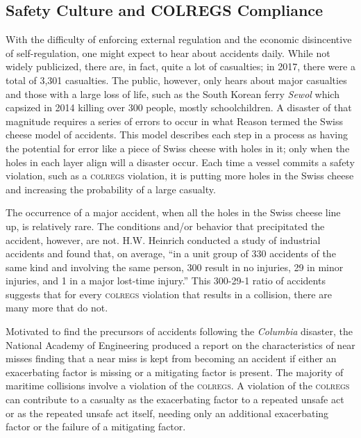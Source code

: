 \documentclass[twoside,symmetric,notoc]{tufte-book}
\begin{document}
\subsection{Safety Culture and COLREGS Compliance}
\par{%
With the difficulty of enforcing external regulation and the economic disincentive of self-regulation, one might expect to hear about accidents daily. While not widely publicized, there are, in fact, quite a lot of casualties; in 2017, there were a total of 3,301 casualties.\cite{EMSA} The public, however, only hears about major casualties and those with a large loss of life, such as the South Korean ferry \textit{Sewol} which capsized in 2014 killing over 300 people, mostly schoolchildren.\cite{Kim} A disaster of that magnitude requires a series of errors to occur in what Reason termed the Swiss cheese model of accidents. This model describes each step in a process as having the potential for error like a piece of Swiss cheese with holes in it; only when the holes in each layer align will a disaster occur. Each time a vessel commits a safety violation, such as a \textsc{colregs} violation, it is putting more holes in the Swiss cheese and increasing the probability of a large casualty.\cite{Reason}
}
\par{%
The occurrence of a major accident, when all the holes in the Swiss cheese line up, is relatively rare. The conditions and/or behavior that precipitated the accident, however, are not. H.W. Heinrich conducted a study of industrial accidents and found that, on average, ``in a unit group of 330 accidents of the same kind and involving the same person, 300 result in no injuries, 29 in minor injuries, and 1 in a major lost-time injury.''\cite{Heinrich} This 300-29-1 ratio of accidents suggests that for every \textsc{colregs} violation that results in a collision, there are many more that do not.\cite{Jones} 
}
\par{%
Motivated to find the precursors of accidents following the \textit{Columbia} disaster, the National Academy of Engineering produced a report on the characteristics of near misses finding that a near miss is kept from becoming an accident if either an exacerbating factor is missing or a mitigating factor is present.\cite{Phimister} The majority of maritime collisions involve a violation of the \textsc{colregs}.\cite{Statheros} A violation of the \textsc{colregs} can contribute to a casualty as the exacerbating factor to a repeated unsafe act or as the repeated unsafe act itself, needing only an additional exacerbating factor or the failure of a mitigating factor.
}
\end{document}
